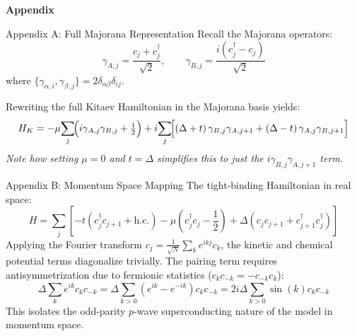 \documentclass[aspectratio=169, 12pt]{beamer}
\newcommand{\cdag}{c^{\dagger}}
\newcommand{\gA}{\gamma_{A,j}}
\newcommand{\gB}{\gamma_{B,j}}
\begin{document}
\appendix

\begin{frame}
  \centering
  \Huge \textbf{Appendix}
\end{frame}

\begin{frame}{Appendix A: Full Majorana Representation}
  Recall the Majorana operators:
  \begin{equation}
    \gamma_{A,j} = \frac{c_j + \cdag_j}{\sqrt{2}}, \qquad
    \gamma_{B,j} = \frac{i(\cdag_j - c_j)}{\sqrt{2}}
  \end{equation}
  where $\{\gamma_{\alpha,i}, \gamma_{\beta,j}\} = 2\delta_{\alpha\beta}\delta_{ij}$.

  \medskip
  Rewriting the full Kitaev Hamiltonian in the Majorana basis yields:
  \begin{equation}
    H_K = -\mu\!\sum_j \!\Bigl(i\gA\gB + \tfrac{1}{2}\Bigr)
          + i\!\sum_j \!\Bigl[
              (\Delta+t)\,\gamma_{B,j}\gamma_{A,j+1}
             +(\Delta-t)\,\gamma_{A,j}\gamma_{B,j+1}
            \Bigr]
  \end{equation}
  \emph{Note how setting $\mu=0$ and $t=\Delta$ simplifies this to just the $i\gamma_{B,j}\gamma_{A,j+1}$ term.}
\end{frame}

\begin{frame}{Appendix B: Momentum Space Mapping}
  The tight-binding Hamiltonian in real space:
  \begin{equation}
    H = \sum_{j} \left[ -t(c^\dagger_j c_{j+1} + \text{h.c.}) - \mu\left(c^\dagger_j c_j - \frac{1}{2}\right) + \Delta(c_j c_{j+1} + c^\dagger_{j+1} c^\dagger_j) \right]
  \end{equation}
  Applying the Fourier transform $c_j = \frac{1}{\sqrt{N}} \sum_{k} e^{ikj} c_k$, the kinetic and chemical potential terms diagonalize trivially. The pairing term requires antisymmetrization due to fermionic statistics ($c_k c_{-k} = -c_{-k} c_k$):
  \begin{equation}
    \Delta \sum_k e^{ik} c_k c_{-k} = \Delta \sum_{k>0} (e^{ik} - e^{-ik}) c_k c_{-k} = 2i\Delta \sum_{k>0} \sin(k) c_k c_{-k}
  \end{equation}
  This isolates the odd-parity $p$-wave superconducting nature of the model in momentum space.
\end{frame}
\end{document}
